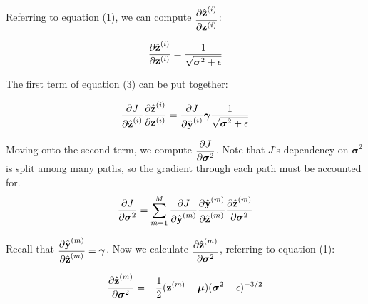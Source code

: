\documentclass{article}
\begin{document}
\begin{multicols*}{2}
Referring to equation (1), we can compute $\begin{aligned}
    {\partial \hat{\textbf{z}}^{(i)} \over \partial \textbf{z}^{(i)}}
\end{aligned}$:

\begin{equation}
    {\partial \hat{\textbf{z}}^{(i)} \over \partial \textbf{z}^{(i)}} = 
    {1 \over \sqrt{\boldsymbol{\sigma}^2 + \epsilon}} \notag
\end{equation}

The first term of equation (3) can be put together:

\begin{equation}
    {\partial J \over \partial \hat{\textbf{z}}^{(i)}}
    {\partial \hat{\textbf{z}}^{(i)} \over \partial \textbf{z}^{(i)}} = {\partial J \over \partial \hat{\textbf{y}}^{(i)}}
    \boldsymbol{\gamma} 
    {1 \over \sqrt{\boldsymbol{\sigma}^2 + \epsilon}} 
\end{equation}

Moving onto the second term, we compute $\begin{aligned}
    {\partial J \over \partial \boldsymbol{\sigma}^2}
\end{aligned}$. Note that $J$'s dependency on $\boldsymbol{\sigma}^2$
is split among many paths, so the gradient through each path must be
accounted for.
\begin{equation}
    {\partial J \over \partial \boldsymbol{\sigma}^2} = 
    \sum_{m = 1}^M {\partial J \over \partial \hat{\textbf{y}}^{(m)}} 
    {\partial \hat{\textbf{y}}^{(m)} \over \partial \hat{\textbf{z}}^{(m)}}
    {\partial \hat{\textbf{z}}^{(m)} \over \partial \boldsymbol{\sigma}^2} \notag
\end{equation}

Recall that $\begin{aligned}
    {\partial \hat{\textbf{y}}^{(m)} \over \partial \hat{\textbf{z}}^{(m)}} = \boldsymbol{\gamma}
\end{aligned}$. Now we calculate $\begin{aligned}
    {\partial \hat{\textbf{z}}^{(m)} \over \partial \boldsymbol{\sigma}^2} 
\end{aligned}$, referring to equation (1):

\begin{equation}
    {\partial \hat{\textbf{z}}^{(m)} \over \partial \boldsymbol{\sigma}^2} =
    -{1\over 2} (\textbf{z}^{(m)} - \boldsymbol{\mu}) (\boldsymbol{\sigma}^2 + \epsilon)^{-3/2} \notag
\end{equation}


\end{multicols*}
\end{document}
